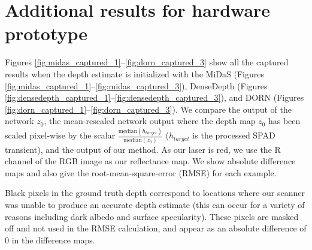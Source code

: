 \documentclass[10pt,letterpaper]{article}
\begin{document}
\section{Additional results for hardware prototype}
Figures \ref{fig:midas_captured_1}--\ref{fig:dorn_captured_3} show all the
captured results when the depth estimate is initialized with the MiDaS
\cite{Lasinger:2019} (Figures \ref{fig:midas_captured_1}--\ref{fig:midas_captured_3}),
DenseDepth (Figures \ref{fig:densedepth_captured_1}--\ref{fig:densedepth_captured_3}),
and DORN (Figures \ref{fig:dorn_captured_1}--\ref{fig:dorn_captured_3}). We compare
the output of the network $z_0$, the mean-rescaled network output where the
depth map $z_0$ has been scaled pixel-wise by the scalar
$\frac{\text{median}(h_{target})}{\text{median}(z_0)}$ ($h_{target}$ is the
processed SPAD transient), and the output of our method. As our laser is red, we
use the R channel of the RGB image as our reflectance map. We show absolute
difference maps and also give the root-mean-square-error (RMSE) for each
example.

Black pixels in the ground truth depth correspond to locations where our scanner
was unable to produce an accurate depth estimate (this can occur for a variety
of reasons including dark albedo and surface specularity). These pixels are masked off and not used in the RMSE
calculation, and appear as an absolute difference of 0 in the difference maps.


{\small


}
\end{document}
